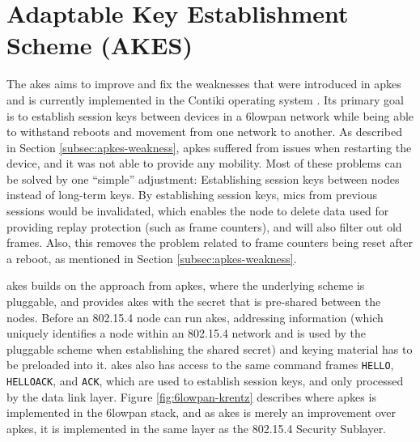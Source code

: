 \section{Adaptable Key Establishment Scheme (AKES)}

The \gls{akes} aims to improve and fix the weaknesses that were introduced in \gls{apkes} and is currently implemented in the Contiki operating system \cite{krentz2015handling}. Its primary goal is to establish session keys between devices in a \gls{6lowpan} network while being able to withstand reboots and movement from one network to another. As described in Section \ref{subsec:apkes-weakness}, \gls{apkes} suffered from issues when restarting the device, and it was not able to provide any mobility. Most of these problems can be solved by one ``simple'' adjustment: Establishing session keys between nodes instead of long-term keys. By establishing session keys, \gls{mic}s from previous sessions would be invalidated, which enables the node to delete data used for providing replay protection (such as frame counters), and will also filter out old frames. Also, this removes the problem related to frame counters being reset after a reboot, as mentioned in Section \ref{subsec:apkes-weakness}. 

\gls{akes} builds on the approach from \gls{apkes}, where the underlying scheme is pluggable, and provides \gls{akes} with the secret that is pre-shared between the nodes. Before an 802.15.4 node can run \gls{akes}, addressing information (which uniquely identifies a node within an 802.15.4 network and is used by the pluggable scheme when establishing the shared secret) and keying material has to be preloaded into it. \gls{akes} also has access to the same command frames \texttt{HELLO}, \texttt{HELLOACK}, and \texttt{ACK}, which are used to establish session keys, and only processed by the data link layer. Figure \ref{fig:6lowpan-krentz} describes where \gls{apkes} is implemented in the \gls{6lowpan} stack, and as \gls{akes} is merely an improvement over \gls{apkes}, it is implemented in the same layer as the 802.15.4 Security Sublayer. 


